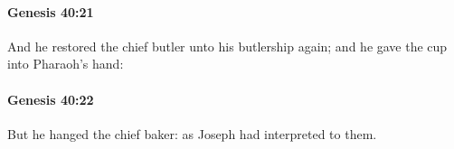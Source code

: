 		\paragraph{Genesis 40:21} %
			\label{GENESIS-40-21}

			And he restored the chief butler unto his butlership again; and he gave the cup into Pharaoh's hand:


		\paragraph{Genesis 40:22} %
			\label{GENESIS-40-22}

			But he hanged the chief baker: as Joseph had interpreted to them.


